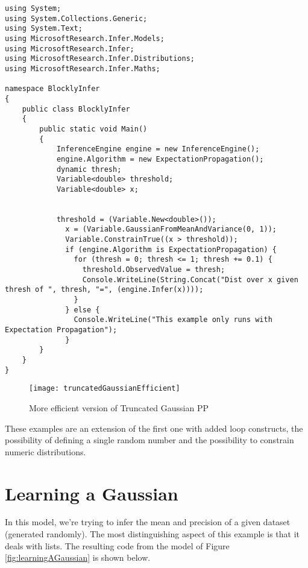 \begin{lstlisting}
using System;
using System.Collections.Generic;
using System.Text;
using MicrosoftResearch.Infer.Models;
using MicrosoftResearch.Infer;
using MicrosoftResearch.Infer.Distributions;
using MicrosoftResearch.Infer.Maths;

namespace BlocklyInfer
{
	public class BlocklyInfer
	{
		public static void Main()
		{
			InferenceEngine engine = new InferenceEngine();
			engine.Algorithm = new ExpectationPropagation();
			dynamic thresh;
			Variable<double> threshold;
			Variable<double> x;


			threshold = (Variable.New<double>());
			  x = (Variable.GaussianFromMeanAndVariance(0, 1));
			  Variable.ConstrainTrue((x > threshold));
			  if (engine.Algorithm is ExpectationPropagation) {
			    for (thresh = 0; thresh <= 1; thresh += 0.1) {
			      threshold.ObservedValue = thresh;
			      Console.WriteLine(String.Concat("Dist over x given thresh of ", thresh, "=", (engine.Infer(x))));
			    }
			  } else {
			    Console.WriteLine("This example only runs with Expectation Propagation");
			  }
		}
	}
}
\end{lstlisting}

\begin{figure}[!htpb]
  \begin{center}
    \leavevmode
    \texttt{[image: truncatedGaussianEfficient]}
    \caption{More efficient version of Truncated Gaussian PP}
    \label{fig:truncatedGaussianEfficient}
  \end{center}
\end{figure}

These examples are an extension of the first one with added loop constructs,
the possibility of defining a single random number and the possibility to constrain
numeric distributions.

\section{Learning a Gaussian}

In this model, we're trying to infer the mean and precision of a given dataset
(generated randomly). The most distinguishing aspect of this example is that it
deals with lists. The resulting code from the model of Figure \ref{fig:learningAGaussian}
is shown below.

